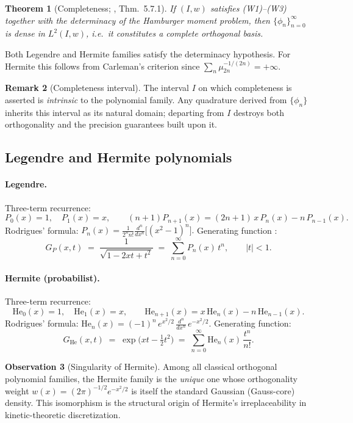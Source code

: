 \documentclass[11pt,a4paper]{article}
\newtheorem{theorem}{Theorem}[section]
\theoremstyle{definition}
\newtheorem{remark}[theorem]{Remark}
\newtheorem{observation}[theorem]{Observation}
\newcommand{\HE}{\mathrm{He}}
\begin{document}
\begin{theorem}[Completeness; \cite{Szego1975}, Thm.~5.7.1]\label{thm:complete}
If $(I,w)$ satisfies \emph{(W1)--(W3)} together with the determinacy of the
Hamburger moment problem, then $\{\phi_n\}_{n=0}^\infty$ is dense in
$L^2(I,w)$, i.e.\ it constitutes a complete orthogonal basis.
\end{theorem}

Both Legendre and Hermite families satisfy the determinacy hypothesis. For
Hermite this follows from Carleman's criterion since
$\sum_n \mu_{2n}^{-1/(2n)}=+\infty$.

\begin{remark}[Completeness interval]\label{rmk:completeness}
The interval $I$ on which completeness is asserted is \emph{intrinsic} to the
polynomial family. Any quadrature derived from $\{\phi_n\}$ inherits this
interval as its natural domain; departing from $I$ destroys both orthogonality
and the precision guarantees built upon it.
\end{remark}

\subsection{Legendre and Hermite polynomials}

\paragraph{Legendre.} Three-term recurrence:
\[
  P_0(x)=1,\quad P_1(x)=x,\qquad
  (n+1)P_{n+1}(x)=(2n+1)\,x\,P_n(x)-n\,P_{n-1}(x).
\]
Rodrigues' formula:
\(
  P_n(x)=\frac{1}{2^n n!}\frac{d^n}{dx^n}\bigl[(x^2-1)^n\bigr].
\)
Generating function \cite{WhittakerWatson1927}:
\[
  G_P(x,t)\;=\;\frac{1}{\sqrt{1-2xt+t^2}}\;=\;\sum_{n=0}^\infty P_n(x)\,t^n,
  \qquad |t|<1.
\]

\paragraph{Hermite (probabilist).} Three-term recurrence:
\[
  \HE_0(x)=1,\quad \HE_1(x)=x,\qquad
  \HE_{n+1}(x)=x\,\HE_n(x)-n\,\HE_{n-1}(x).
\]
Rodrigues' formula:
\(
  \HE_n(x)=(-1)^n\,e^{x^2/2}\,\frac{d^n}{dx^n}\,e^{-x^2/2}.
\)
Generating function:
\[
  G_{\HE}(x,t)\;=\;\exp\!\bigl(xt-\tfrac{1}{2}t^2\bigr)
  \;=\;\sum_{n=0}^\infty \HE_n(x)\,\frac{t^n}{n!}.
\]

\begin{observation}[Singularity of Hermite]\label{obs:hermite-singular}
Among all classical orthogonal polynomial families, the Hermite family is the
\emph{unique} one whose orthogonality weight
$w(x)=(2\pi)^{-1/2}e^{-x^2/2}$ is itself the standard Gaussian
(Gauss-core) density. This isomorphism is the structural origin of Hermite's
irreplaceability in kinetic-theoretic discretization.
\end{observation}
\end{document}
